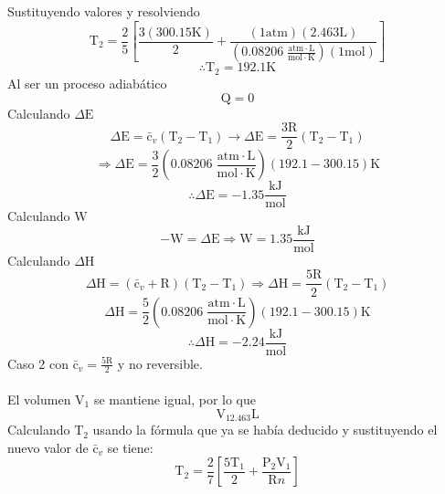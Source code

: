 \documentclass[12pt]{article}
\begin{document}
Sustituyendo valores y resolviendo
\begin{displaymath}
	\mathrm{T}_2=\frac{2}{5} \left[ \frac{3(300.15\mathrm{K})}{2}+\frac{(1\mathrm{atm})(2.463\mathrm{L})}{(0.08206\; \frac{\mathrm{atm}\cdot\mathrm{L}}{\mathrm{mol}\cdot\mathrm{K}})(1\mathrm{mol})} \right]
\end{displaymath}
\begin{displaymath}
	\therefore \mathrm{T}_2=192.1\mathrm{K}
\end{displaymath}
Al ser un proceso adiabático 
\begin{displaymath}
	\mathrm{Q}=0
\end{displaymath}
Calculando $\Delta\mathrm{E}$
\begin{displaymath}
	\Delta \mathrm{E}=\mathrm{\bar{c}}_v(\mathrm{T}_2-\mathrm{T}_1)\rightarrow \Delta\mathrm{E}=\frac{3\mathrm{R}}{2}\left( \mathrm{T}_2-\mathrm{T}_1 \right)
\end{displaymath}
\begin{displaymath}
	\Rightarrow \Delta\mathrm{E}=\frac{3}{2}\left( 0.08206\; \frac{\mathrm{atm}\cdot\mathrm{L}}{\mathrm{mol}\cdot\mathrm{K}} \right) \left( 192.1-300.15 \right)\mathrm{K}
\end{displaymath}
\begin{displaymath}
	\therefore \Delta\mathrm{E}=-1.35\frac{\mathrm{kJ}}{\mathrm{mol}}
\end{displaymath}
Calculando $\mathrm{W}$
\begin{displaymath}
	-\mathrm{W}=\Delta\mathrm{E}\Rightarrow \mathrm{W}=1.35\frac{\mathrm{kJ}}{\mathrm{mol}}
\end{displaymath}
Calculando $\Delta\mathrm{H}$
\begin{displaymath}
	\Delta\mathrm{H}=(\mathrm{\bar{c}}_v+\mathrm{R})(\mathrm{T}_2-\mathrm{T}_1)\Rightarrow \Delta\mathrm{H}=\frac{5\mathrm{R}}{2}(\mathrm{T}_2-\mathrm{T}_1)
\end{displaymath}
\begin{displaymath}
	\Delta\mathrm{H}=\frac{5}{2}\left( 0.08206\; \frac{\mathrm{atm}\cdot\mathrm{L}}{\mathrm{mol}\cdot\mathrm{K}} \right)\left( 192.1-300.15 \right)\mathrm{K}
\end{displaymath}
\begin{displaymath}
	\therefore \Delta\mathrm{H}=-2.24 \frac{\mathrm{kJ}}{\mathrm{mol}}
\end{displaymath}
\newpage
Caso 2 con $\mathrm{\bar{c}}_v=\frac{5\mathrm{R}}{2}$ y no reversible.\\
\\
El volumen $\mathrm{V}_1$ se mantiene igual, por lo que
\begin{displaymath}
	\mathrm{V}_12.463\mathrm{L}
\end{displaymath}
Calculando $\mathrm{T}_2$ usando la fórmula que ya se había deducido y sustituyendo el nuevo valor de $\mathrm{\bar{c}}_v$ se tiene:
\begin{displaymath}
	\mathrm{T}_2=\frac{2}{7}\left[ \frac{5\mathrm{T}_1}{2}+\frac{\mathrm{P}_2\mathrm{V}_1}{\mathrm{R}n} \right]
\end{displaymath}
\end{document}
